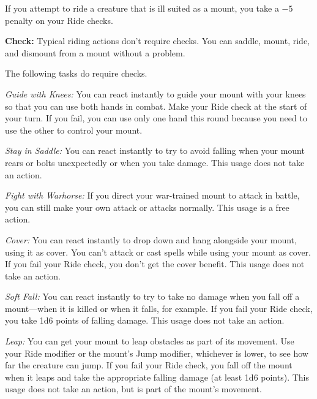 If you attempt to ride a creature that is ill suited as a mount, you take a $-5$ penalty on your Ride checks.

\textbf{Check:} Typical riding actions don't require checks. You can saddle, mount, ride, and dismount from a mount without a problem.

The following tasks do require checks.


\textit{Guide with Knees:} You can react instantly to guide your mount with your knees so that you can use both hands in combat. Make your Ride check at the start of your turn. If you fail, you can use only one hand this round because you need to use the other to control your mount.

\textit{Stay in Saddle:} You can react instantly to try to avoid falling when your mount rears or bolts unexpectedly or when you take damage. This usage does not take an action.

\textit{Fight with Warhorse:} If you direct your war-trained mount to attack in battle, you can still make your own attack or attacks normally. This usage is a free action.

\textit{Cover:} You can react instantly to drop down and hang alongside your mount, using it as cover. You can't attack or cast spells while using your mount as cover. If you fail your Ride check, you don't get the cover benefit. This usage does not take an action.

\textit{Soft Fall:} You can react instantly to try to take no damage when you fall off a mount---when it is killed or when it falls, for example. If you fail your Ride check, you take 1d6 points of falling damage. This usage does not take an action.

\textit{Leap:} You can get your mount to leap obstacles as part of its movement. Use your Ride modifier or the mount's Jump modifier, whichever is lower, to see how far the creature can jump. If you fail your Ride check, you fall off the mount when it leaps and take the appropriate falling damage (at least 1d6 points). This usage does not take an action, but is part of the mount's movement.


